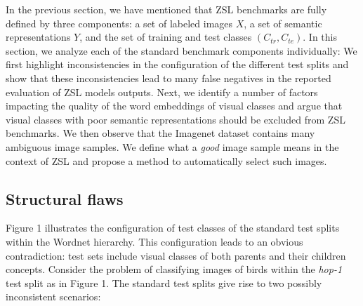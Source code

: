 In the previous section, we have mentioned that ZSL benchmarks are fully defined by three components: %
a set of labeled images $X$, a set of semantic representations $Y$, and the set of training and test classes $(C_{tr}, C_{te})$.
In this section, we analyze each of the standard benchmark components individually:
We first highlight inconsistencies in the configuration of the different test splits 
and show that these inconsistencies lead to many false negatives in the reported evaluation of ZSL models outputs.
Next, we identify a number of factors impacting the quality of the word embeddings 
of visual classes and argue that visual classes with poor semantic representations should be excluded from ZSL benchmarks.
We then observe that the Imagenet dataset contains many ambiguous image samples.
We define what a \textit{good} image sample means in the context of ZSL
and propose a method to automatically select such images.

\subsection{Structural flaws}

Figure 1 illustrates the configuration of test classes of the standard test splits within the Wordnet hierarchy.
This configuration leads to an obvious contradiction: test sets include visual classes of both parents and their children concepts.
Consider the problem of classifying images of birds within the \textit{hop-1} test split as in Figure 1.
The standard test splits give rise to two possibly inconsistent scenarios:

